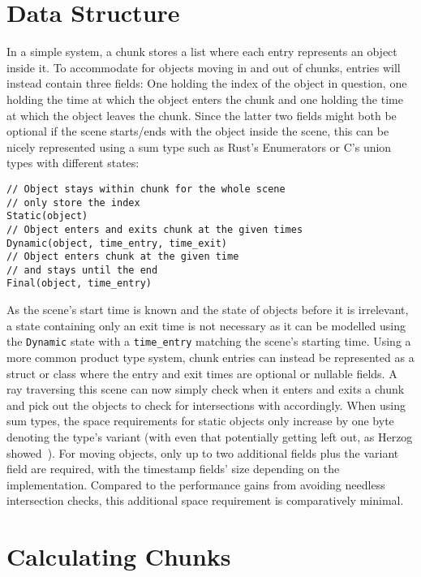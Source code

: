 \section{Data Structure}

In a simple system, a chunk stores a list where each entry represents an object inside it.
To accommodate for objects moving in and out of chunks, entries will instead contain three fields:
One holding the index of the object in question,
one holding the time at which the object enters the chunk
and one holding the time at which the object leaves the chunk.
Since the latter two fields might both be optional if the scene starts/ends with the object inside the scene,
this can be nicely represented using a sum type such as Rust's Enumerators or C's union types with different states:

\begin{verbatim}
// Object stays within chunk for the whole scene
// only store the index
Static(object)
// Object enters and exits chunk at the given times
Dynamic(object, time_entry, time_exit)
// Object enters chunk at the given time
// and stays until the end
Final(object, time_entry)
\end{verbatim}

As the scene's start time is known and the state of objects before it is irrelevant,
a state containing only an exit time is not necessary as it can be modelled using the
\verb|Dynamic| state with a \verb|time_entry| matching the scene's starting time.
Using a more common product type system, chunk entries can instead be represented as a
struct or class where the entry and exit times are optional or nullable fields.
\newline
A ray traversing this scene can now simply check when it enters and exits a chunk
and pick out the objects to check for intersections with accordingly.
When using sum types, the space requirements for static objects only increase by one byte denoting the type's variant
(with even that potentially getting left out, as Herzog showed~\cite{He23}).
For moving objects, only up to two additional fields plus the variant field are required,
with the timestamp fields' size depending on the implementation.
Compared to the performance gains from avoiding needless intersection checks,
this additional space requirement is comparatively minimal.

\section{Calculating Chunks}

